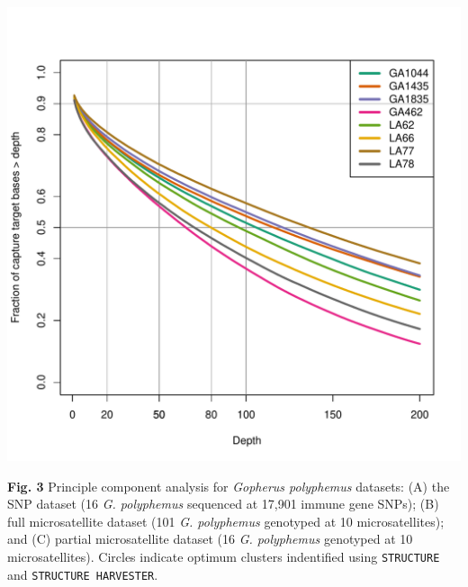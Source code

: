 \documentclass[english]{article}\usepackage[]{graphicx}\usepackage[]{color}
\makeatletter
\def\maxwidth{ %
  \ifdim\Gin@nat@width>\linewidth
    \linewidth
  \else
    \Gin@nat@width
  \fi
}
\newenvironment{knitrout}{}{} %
\makeatother
\begin{document}
\pagebreak{}
\noindent
\begin{knitrout}
\color{fgcolor}
\includegraphics[width=\maxwidth]{figure/Figure-3-1} 

\end{knitrout}
\noindent
\textbf{Fig. 3} Principle component analysis for \textit{Gopherus polyphemus} datasets: (A) the SNP dataset (16 \textit{G. polyphemus} sequenced at 17,901 immune gene SNPs); (B) full microsatellite dataset (101 \textit{G. polyphemus} genotyped at 10 microsatellites); and (C) partial microsatellite dataset (16 \textit{G. polyphemus} genotyped at 10 microsatellites). Circles indicate optimum clusters indentified using \texttt{STRUCTURE} and \texttt{STRUCTURE HARVESTER}.\\
\end{document}
